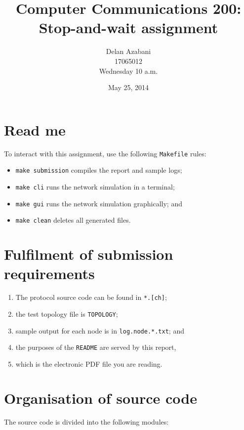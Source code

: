 \documentclass[a4paper,12pt,titlepage]{article}
\title{Computer Communications 200:\\
       Stop-and-wait assignment}
\date{May 25, 2014}
\author{Delan Azabani\\17065012\\Wednesday 10 a.m.}
\begin{document}

\maketitle


\section{Read me}

To interact with this assignment, use the following \texttt{Makefile} rules:

\begin{itemize}
	\item \texttt{make submission} compiles the report and sample logs;
	\item \texttt{make cli} runs the network simulation in a terminal;
	\item \texttt{make gui} runs the network simulation graphically; and
	\item \texttt{make clean} deletes all generated files.
\end{itemize}

\section{Fulfilment of submission requirements}

\begin{enumerate}
	\item The protocol source code can be found in \texttt{*.[ch]};
	\item the test topology file is \texttt{TOPOLOGY};
	\item sample output for each node is in \texttt{log.node.*.txt}; and
	\item the purposes of the \texttt{README} are served by this report,
	\item which is the electronic PDF file you are reading.
\end{enumerate}

\section{Organisation of source code}

The source code is divided into the following modules:
\end{document}
